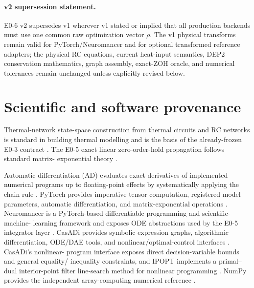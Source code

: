 \documentclass[11pt]{article}
\begin{document}
\paragraph{v2 supersession statement.}
E0-6 v2 supersedes v1 wherever v1 stated or implied that all production
backends must use one common raw optimization vector $\rho$. The v1 physical
transforms remain valid for PyTorch/Neuromancer and for optional transformed
reference adapters; the physical RC equations, current heat-input semantics,
DEP2 conservation mathematics, graph assembly, exact-ZOH oracle, and numerical
tolerances remain unchanged unless explicitly revised below.


\section{Scientific and software provenance}

Thermal-network state-space construction from thermal circuits and RC networks
is standard in building thermal modelling and is the basis of the already-frozen
E0-3 contract \cite{GhiausAhmad2020ThermalCircuits,BacherMadsen2011HeatDynamics,
ArroyoSpiessensHelsen2020MultiZone,VallianosAthienitisDelcroix2022MultiZoneRC}.
The E0-5 exact linear zero-order-hold propagation follows standard matrix-
exponential theory \cite{Higham2009MatrixExponential,VanLoan1978MatrixExponentialIntegrals}.

Automatic differentiation (AD) evaluates exact derivatives of implemented
numerical programs up to floating-point effects by systematically applying the
chain rule \cite{Baydin2018AD}. PyTorch provides imperative tensor computation,
registered model parameters, automatic differentiation, and matrix-exponential
operations \cite{Paszke2019PyTorch,PyTorchParameterDocs2026,PyTorchMatrixExpDocs2026}.
Neuromancer is a PyTorch-based differentiable programming and scientific-machine-
learning framework and exposes ODE abstractions used by the E0-5 integrator layer
\cite{Neuromancer2023,NeuromancerDocs2026}. CasADi provides symbolic expression
graphs, algorithmic differentiation, ODE/DAE tools, and nonlinear/optimal-control
interfaces \cite{Andersson2019CasADi,CasADiDocs2026}. CasADi's nonlinear-
program interface exposes direct decision-variable bounds and general equality/
inequality constraints, and IPOPT implements a primal--dual interior-point
filter line-search method for nonlinear programming
\cite{WachterBiegler2006IPOPT,CasADiDocs2026}. NumPy provides the
independent array-computing numerical reference \cite{Harris2020NumPy}.
\end{document}
